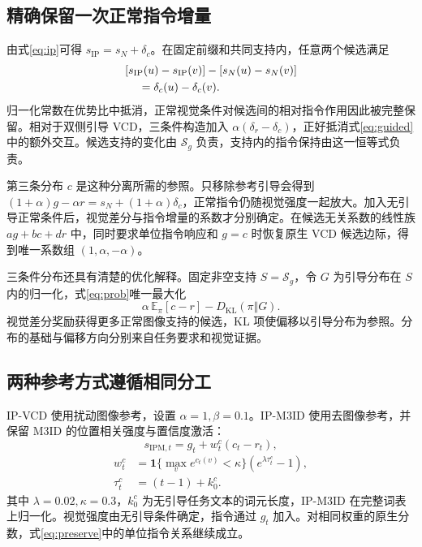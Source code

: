 \documentclass[11pt,twocolumn,a4paper]{article}
\begin{document}
\subsection{精确保留一次正常指令增量}
由式\eqref{eq:ip}可得 $s_{\mathrm{IP}}=s_N+\delta_c$。在固定前缀和共同支持内，任意两个候选满足
\begin{equation}\begin{aligned}
&[s_{\mathrm{IP}}(u)-s_{\mathrm{IP}}(v)]-[s_N(u)-s_N(v)]\\
&\hspace{1.2em}=\delta_c(u)-\delta_c(v).
\end{aligned}\label{eq:preserve}\end{equation}
归一化常数在优势比中抵消，正常视觉条件对候选间的相对指令作用因此被完整保留。相对于双侧引导 VCD，三条件构造加入 $\alpha(\delta_r-\delta_c)$，正好抵消式\eqref{eq:guided}中的额外交互。候选支持的变化由 $\mathcal S_g$ 负责，支持内的指令保持由这一恒等式负责。

第三条分布 $c$ 是这种分离所需的参照。只移除参考引导会得到 $(1+\alpha)g-\alpha r=s_N+(1+\alpha)\delta_c$，正常指令仍随视觉强度一起放大。加入无引导正常条件后，视觉差分与指令增量的系数才分别确定。在候选无关系数的线性族 $ag+bc+dr$ 中，同时要求单位指令响应和 $g=c$ 时恢复原生 VCD 候选边际，得到唯一系数组 $(1,\alpha,-\alpha)$。

三条件分布还具有清楚的优化解释。固定非空支持 $S=\mathcal S_g$，令 $G$ 为引导分布在 $S$ 内的归一化，式\eqref{eq:prob}唯一最大化
\begin{equation}
\alpha\,\mathbb E_\pi[c-r]-D_{\mathrm{KL}}(\pi\Vert G).
\label{eq:kl}\end{equation}
视觉差分奖励获得更多正常图像支持的候选，KL 项使偏移以引导分布为参照。分布的基础与偏移方向分别来自任务要求和视觉证据。

\subsection{两种参考方式遵循相同分工}
IP-VCD 使用扰动图像参考，设置 $\alpha=1,\beta=0.1$。IP-M3ID 使用去图像参考，并保留 M3ID 的位置相关强度与置信度激活：
\begin{equation}s_{\mathrm{IPM},t}=g_t+w_t^c(c_t-r_t),\label{eq:ipm}\end{equation}
\begin{equation}\begin{aligned}
w_t^c&=\mathbf1\{\max_v e^{c_t(v)}<\kappa\}(e^{\lambda\tau_t^c}-1),\\
\tau_t^c&=(t-1)+k_0^c.
\end{aligned}\label{eq:weight}\end{equation}
其中 $\lambda=0.02,\kappa=0.3$，$k_0^c$ 为无引导任务文本的词元长度，IP-M3ID 在完整词表上归一化。视觉强度由无引导条件确定，指令通过 $g_t$ 加入。对相同权重的原生分数，式\eqref{eq:preserve}中的单位指令关系继续成立。
\end{document}
